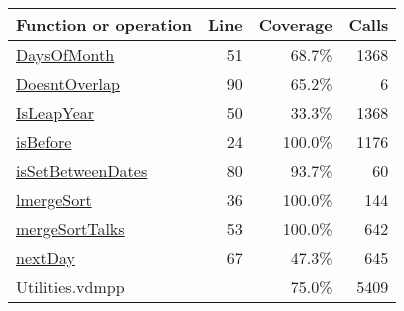 \begin{longtable}{|l|r|r|r|}
\hline
Function or operation & Line & Coverage & Calls \\
\hline
\hline
\hyperref[DaysOfMonth:51]{DaysOfMonth} & 51&68.7\% & 1368 \\
\hline
\hyperref[DoesntOverlap:90]{DoesntOverlap} & 90&65.2\% & 6 \\
\hline
\hyperref[IsLeapYear:50]{IsLeapYear} & 50&33.3\% & 1368 \\
\hline
\hyperref[isBefore:24]{isBefore} & 24&100.0\% & 1176 \\
\hline
\hyperref[isSetBetweenDates:80]{isSetBetweenDates} & 80&93.7\% & 60 \\
\hline
\hyperref[lmergeSort:36]{lmergeSort} & 36&100.0\% & 144 \\
\hline
\hyperref[mergeSortTalks:53]{mergeSortTalks} & 53&100.0\% & 642 \\
\hline
\hyperref[nextDay:67]{nextDay} & 67&47.3\% & 645 \\
\hline
\hline
Utilities.vdmpp & & 75.0\% & 5409 \\
\hline
\end{longtable}

